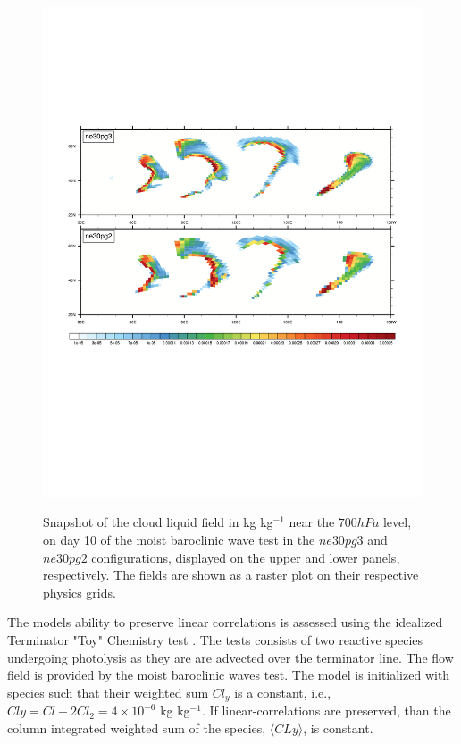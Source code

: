 \documentclass{agujournal}
\begin{document}
\begin{figure}[t]
\begin{center}
\noindent\includegraphics[width=30pc,angle=0]{figs/temp_CLDLIQ.pdf}\\
\end{center}
\caption{Snapshot of the cloud liquid field in kg kg$^{-1}$ near the $700 hPa$ level, on day 10 of the moist baroclinic wave test in the $ne30pg3$ and $ne30pg2$ configurations, displayed on the upper and lower panels, respectively. The fields are shown as a raster plot on their respective physics grids.}
\label{fig:baro}
\end{figure}

The models ability to preserve linear correlations is assessed using the idealized Terminator "Toy" Chemistry test \citep{LCLVT2015GMD,LTOUNGK2017MWR}. The tests consists of two reactive species undergoing photolysis as they are are advected over the terminator line. The flow field is provided by the moist baroclinic waves test. The model is initialized with species such that their weighted sum $Cl_y$ is a constant, i.e., $Cly = Cl + 2Cl_2 = 4\times10^{-6}$ kg kg$^{-1}$. If linear-correlations are preserved, than the column integrated weighted sum of the species, $\langle CLy \rangle$, is constant.
\end{document}
